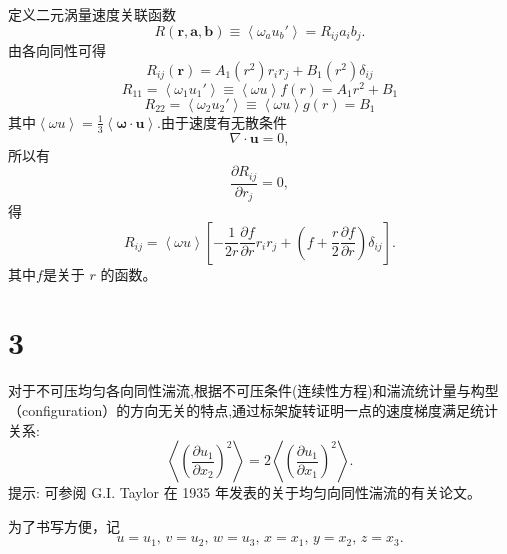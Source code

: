 \documentclass[12pt,a4]{ctexart}
\begin{document}
定义二元涡量速度关联函数
\begin{equation}
   R ( \bm{r}, \bm{a} , \bm{b}  ) \equiv \left< \omega_{a} u_{b}' \right> = R_{ij} a_i b_j.
\end{equation}
由各向同性可得
\begin{equation}
   R_{ij}(\bm{r}) = A_1(r^2) r_i r_j + B_1(r^2) \delta_{ij}
\end{equation}
\begin{equation}
   R_{11} = \left< \omega_1 u_1' \right> \equiv \left< \omega u \right> f(r) = A_1 r^2 + B_1
\end{equation}
\begin{equation}
   R_{22} = \left< \omega_2 u_2' \right> \equiv \left< \omega u \right> g(r) = B_1
\end{equation}
其中$\left< \omega u \right> = \frac{1}{3} \left< \bm{\omega} \cdot \bm{u}\right>$.由于速度有无散条件
\begin{equation}
   \nabla \cdot \bm{u} = 0,
\end{equation}
所以有
\begin{equation}
   \frac{\partial R_{ij}}{\partial r_j} = 0,
\end{equation}
得
\begin{equation}
   R_{ij} = \left< \omega u \right> \left[ - \frac{1}{2r} \frac{\partial f}{\partial r} r_{i} r_{j} + \left( f + \frac{r}{2} \frac{\partial f}{\partial r} \right) \delta_{ij} \right] .
\end{equation}
其中$f$是关于 $r$ 的函数。


\section{3}
对于不可压均匀各向同性湍流,根据不可压条件(连续性方程)和湍流统计量与构型（configuration）的方向无关的特点,通过标架旋转证明一点的速度梯度满足统计关系:
\begin{equation}
   \left\langle\left(\frac{\partial u_{1}}{\partial x_{2}}\right)^{2}\right\rangle=2\left\langle\left(\frac{\partial u_{1}}{\partial x_{1}}\right)^{2}\right\rangle.
\end{equation}
提示: 可参阅 G.I. Taylor 在 1935 年发表的关于均匀向同性湍流的有关论文。


为了书写方便，记
\begin{equation}
   u = u_1,\, v = u_2,\, w = u_3,\, x = x_1,\, y = x_2,\, z = x_3.
\end{equation}
\end{document}
